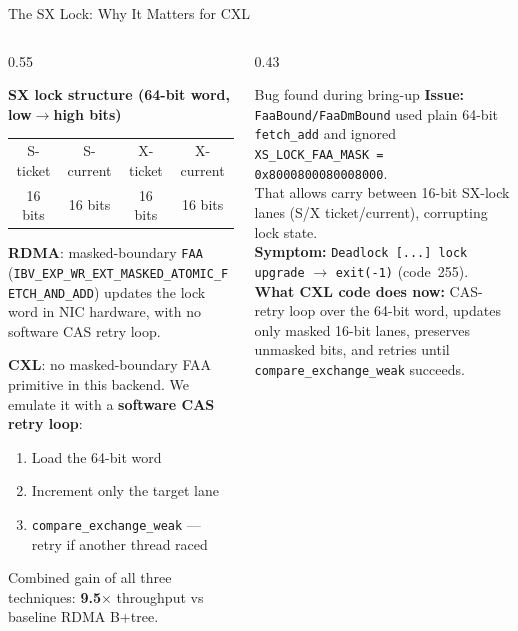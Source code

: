 \documentclass[aspectratio=169,8pt]{beamer}
\newcommand{\hl}[1]{\textcolor{VTMaroon}{\textbf{#1}}}
\newcommand{\sys}[1]{\texttt{#1}}
\begin{document}
\begin{frame}{The SX Lock: Why It Matters for CXL}

\begin{columns}[T,onlytextwidth]
\begin{column}{0.55\textwidth}

\textbf{SX lock structure (64-bit word, low$\rightarrow$high bits)}\\[0.4em]
{\small
\begin{tabular}{|c|c|c|c|}
\hline
S-ticket & S-current & X-ticket & X-current \\
16 bits  & 16 bits   & 16 bits  & 16 bits   \\
\hline
\end{tabular}
}

\vspace{0.6em}
\textbf{RDMA}: masked-boundary \sys{FAA} (\sys{IBV\_EXP\_WR\_EXT\_MASKED\_ATOMIC\_FETCH\_AND\_ADD}) updates the lock word in NIC hardware, with no software CAS retry loop.

\vspace{0.6em}
\textbf{CXL}: no masked-boundary FAA primitive in this backend. We emulate it with a \hl{software CAS retry loop}:
\begin{enumerate}
  \item Load the 64-bit word
  \item Increment only the target lane
  \item \sys{compare\_exchange\_weak} — retry if another thread raced
\end{enumerate}

\vspace{0.4em}
{\small Combined gain of all three techniques: \hl{9.5$\times$} throughput vs baseline RDMA B+tree.}

\end{column}
\begin{column}{0.43\textwidth}

\begin{alertblock}{Bug found during bring-up}
\small \textbf{Issue:} \sys{FaaBound/FaaDmBound} used plain 64-bit \sys{fetch\_add} and ignored\\
\sys{XS\_LOCK\_FAA\_MASK = 0x8000800080008000}.\\[0.3em]
That allows carry between 16-bit SX-lock lanes (S/X ticket/current), corrupting lock state.\\[0.3em]
\textbf{Symptom:} \texttt{Deadlock [...] lock upgrade} $\to$ \texttt{exit(-1)} (code~255).\\[0.3em]
\textbf{What CXL code does now:} CAS-retry loop over the 64-bit word, updates only masked 16-bit lanes, preserves unmasked bits, and retries until \sys{compare\_exchange\_weak} succeeds.
\end{alertblock}


\end{column}
\end{columns}
\end{frame}
\end{document}
